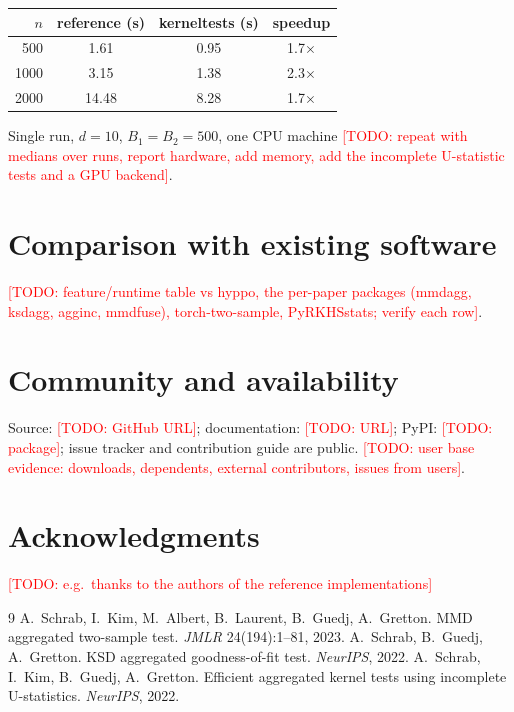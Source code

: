 \documentclass[11pt]{article}
\newcommand{\todo}[1]{\textcolor{red}{[TODO: #1]}}
\begin{document}
\begin{center}
\begin{tabular}{rccc}
\toprule
$n$ & reference (s) & kerneltests (s) & speedup\\
\midrule
500 & 1.61 & 0.95 & 1.7$\times$\\
1000 & 3.15 & 1.38 & 2.3$\times$\\
2000 & 14.48 & 8.28 & 1.7$\times$\\
\bottomrule
\end{tabular}
\end{center}
Single run, $d=10$, $B_1=B_2=500$, one CPU machine \todo{repeat with medians over runs, report hardware,
add memory, add the incomplete U-statistic tests and a GPU backend}.

\section{Comparison with existing software}
\todo{feature/runtime table vs hyppo, the per-paper packages (mmdagg, ksdagg, agginc, mmdfuse),
torch-two-sample, PyRKHSstats; verify each row}.

\section{Community and availability}
Source: \todo{GitHub URL}; documentation: \todo{URL}; PyPI: \todo{package}; issue tracker and contribution guide
are public. \todo{user base evidence: downloads, dependents, external contributors, issues from users}.

\section*{Acknowledgments}
\todo{e.g.\ thanks to the authors of the reference implementations}

\begin{thebibliography}{9}
 A.~Schrab, I.~Kim, M.~Albert, B.~Laurent, B.~Guedj, A.~Gretton. MMD aggregated two-sample test. \emph{JMLR} 24(194):1--81, 2023.
 A.~Schrab, B.~Guedj, A.~Gretton. KSD aggregated goodness-of-fit test. \emph{NeurIPS}, 2022.
 A.~Schrab, I.~Kim, B.~Guedj, A.~Gretton. Efficient aggregated kernel tests using incomplete U-statistics. \emph{NeurIPS}, 2022.
\end{thebibliography}
\end{document}
